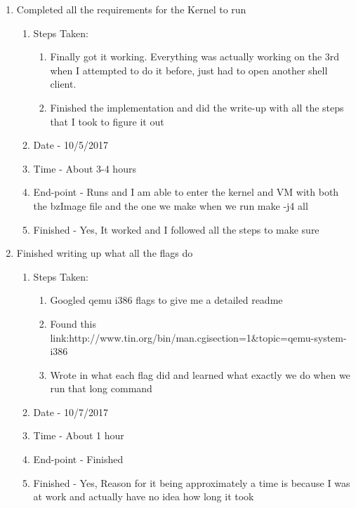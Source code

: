 \documentclass[letterpaper,10pt,fleqn]{article}
\begin{document}
\begin{enumerate}
	\item Completed all the requirements for the Kernel to run
		\begin{enumerate}
			\item Steps Taken:
				\begin{enumerate}
					\item Finally got it working. Everything was actually working on the 3rd when I attempted to do it before, just had to open another shell client.
					\item Finished the implementation and did the write-up with all the steps that I took to figure it out
				\end{enumerate}
			\item Date - 10/5/2017
			\item Time - About 3-4 hours
			\item End-point - Runs and I am able to enter the kernel and VM with both the bzImage file and the one we make when we run make -j4 all
			\item Finished - Yes, It worked and I followed all the steps to make sure
		\end {enumerate}		
			
	\item Finished writing up what all the flags do
		\begin{enumerate}
			\item Steps Taken:
				\begin{enumerate}
					\item Googled qemu i386 flags to give me a detailed readme
					\item Found this link:http://www.tin.org/bin/man.cgisection=1\&topic=qemu-system-i386
					\item Wrote in what each flag did and learned what exactly we do when we run that long command
				\end{enumerate}
			\item Date - 10/7/2017
			\item Time - About 1 hour
			\item End-point - Finished
			\item Finished -  Yes, Reason for it being approximately a time is because I was at work and actually have no idea how long it took
		\end {enumerate}		
			

\end{enumerate}
\end{document}
